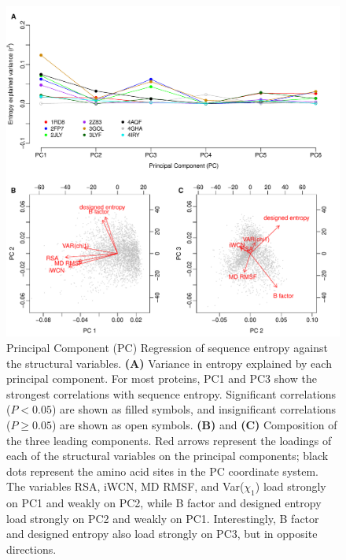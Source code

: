 \documentclass[smallextended]{svjour3}
\begin{document}
\begin{figure}[tbh]
\begin{center}
      \includegraphics[width=6.5in]{PC_screen_entropy.pdf} %
\end{center}
\caption{Principal Component (PC) Regression of sequence entropy against the structural variables. {\bf (A)} Variance in entropy explained by each principal component. For most proteins, PC1 and PC3 show the strongest correlations with sequence entropy. Significant correlations ($P<0.05$) are shown as filled symbols, and insignificant correlations ($P\geq0.05$) are shown as open symbols. {\bf (B)} and {\bf (C)} Composition of the three leading components. Red arrows represent the loadings of each of the structural variables on the principal components; black dots represent the amino acid sites in the PC coordinate system. The variables RSA, iWCN, MD RMSF, and Var($\chi_1$) load strongly on PC1 and weakly on PC2, while B factor and designed entropy load strongly on PC2 and weakly on PC1. Interestingly, B factor and designed entropy also load strongly on PC3, but in opposite directions.}
\label{fig:cor_entropy_PC_screen}
\end{figure}




\clearpage
\end{document}
